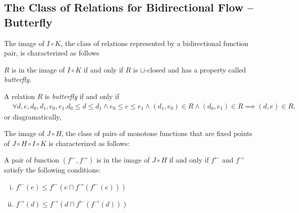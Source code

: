 \documentclass{llncs}
\newcommand{\ff}{{f^{\rightarrow}}}
\newcommand{\fb}{{f^{\leftarrow}}}
\newcommand{\join}{\sqcup}
\newcommand{\meet}{\sqcap}
\newcommand{\comp}{\circ}
\newcommand{\rotleq}{\rotatebox[origin=c]{90}{$\leq$}}
\begin{document}
  \subsection{The Class of Relations for Bidirectional Flow -- Butterfly}
  The image of $I \comp K$, the class of relations represented by a bidirectional function pair, is characterized as follows

  \begin{proposition}\label{prop:butterfly}
    $R$ is in the image of $I \comp K$ if and only if $R$ is $\join$-closed and has a property called \emph{butterfly}.
  \end{proposition}
  \begin{definition}
    A relation $R$ is \emph{butterfly} if and only if \begin{align*}
      &\forall d, e, d_{0}, d_{1 }, e_{0}, e_{1} .
      d_{0} \leq d \leq d_{1} \land e_{0} \leq e \leq e_{1} \land (d_{1}, e_{0}) \in R \land (d_{0}, e_{1}) \in R \implies (d, e) \in R,
    \end{align*}or diagramatically, \quad
  \end{definition}

  The image of $J \comp H$, the class of pairs of monotone functions that are fixed points of $J \comp H \comp I \comp K$ is characterized as follows:
  \begin{proposition} \label{prop:pair-nice}
    A pair of function $(\fb , \ff)$ is in the image of $J \comp H$ if and only if $\fb$ and $\ff$ satisfy the following conditions:
    \begin{enumerate}[i.]
      \item $\fb(e) \leq \fb(e \meet \ff (\fb(e)))$
      \item $\ff(d) \leq \ff(d \meet \fb (\ff(d)))$
    \end{enumerate}
  \end{proposition}
\end{document}
